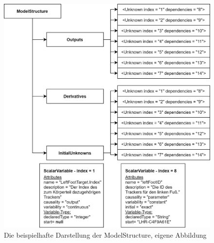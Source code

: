 \begin{figure}[h]
	\centering
	\includegraphics[width=0.85\linewidth]{Bilder/A31_ModelStructure}
	\caption{Die beispielhafte Darstellung der ModelStructure, eigene Abbildung}
	\label{fig:ModelStructure}
\end{figure}
\newpage
